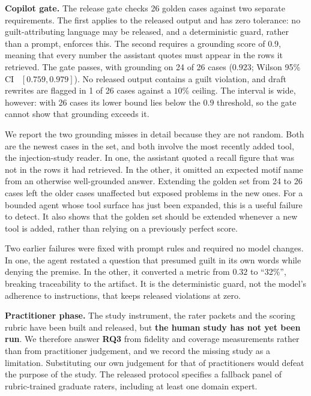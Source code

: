 \documentclass[conference]{IEEEtran}
\newcommand{\RQ}[1]{\textbf{RQ#1}}
\begin{document}
\textbf{Copilot gate.} The release gate checks 26 golden cases against two
separate requirements. The first applies to the released output and has zero
tolerance: no guilt-attributing language may be released, and a deterministic
guard, rather than a prompt, enforces this. The second requires a grounding
score of $0.9$, meaning that every number the assistant quotes must appear in
the rows it retrieved. The gate passes, with grounding on 24 of 26 cases
($0.923$; Wilson 95\% CI~\cite{wilson1927} $[0.759, 0.979]$). No released output contains a guilt violation, and
draft rewrites are flagged in 1 of 26 cases against a $10\%$ ceiling. The interval is wide, however: with 26 cases its lower bound lies below
the $0.9$ threshold, so the gate cannot show that grounding exceeds it.

We report the two grounding misses in detail because they are not random.
Both are the newest cases in the set, and both involve the most recently added
tool, the injection-study reader. In one, the assistant quoted a recall figure
that was not in the rows it had retrieved. In the other, it omitted an expected
motif name from an otherwise well-grounded answer. Extending the golden set
from 24 to 26 cases left the older cases unaffected but exposed problems in the
new ones. For a bounded agent whose tool surface has just been expanded, this is a
useful failure to detect. It also shows that the golden set should be extended
whenever a new tool is added, rather than relying on a previously perfect
score.

Two earlier failures were fixed with prompt rules and required no model
changes. In one, the agent restated a question that presumed guilt in its own words
while denying the premise. In the other, it converted a metric from $0.32$ to
``32\%'', breaking traceability to the artifact. It is the
deterministic guard, not the model's adherence to instructions, that keeps
released violations at zero.

\textbf{Practitioner phase.} The study instrument, the rater packets and the
scoring rubric have been built and released, but \textbf{the human study has
not yet been run}. We therefore answer \RQ{3} from fidelity and coverage measurements rather than
from practitioner judgement, and we record the missing study as a limitation.
Substituting our own judgement for that of practitioners would defeat the
purpose of the study. The released protocol
specifies a fallback panel of rubric-trained graduate raters, including at
least one domain expert.
\end{document}
